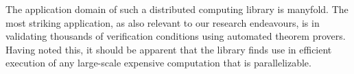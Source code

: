 \documentclass[preprint]{sigplanconf}
\begin{document}
The application domain of such a distributed computing library is
manyfold.  The most striking application, as also relevant to our
research endeavours, is in validating thousands of verification
conditions using automated theorem provers. Having noted this, it
should be apparent that the library finds use in efficient execution
of any large-scale expensive computation that is parallelizable.
\end{document}
